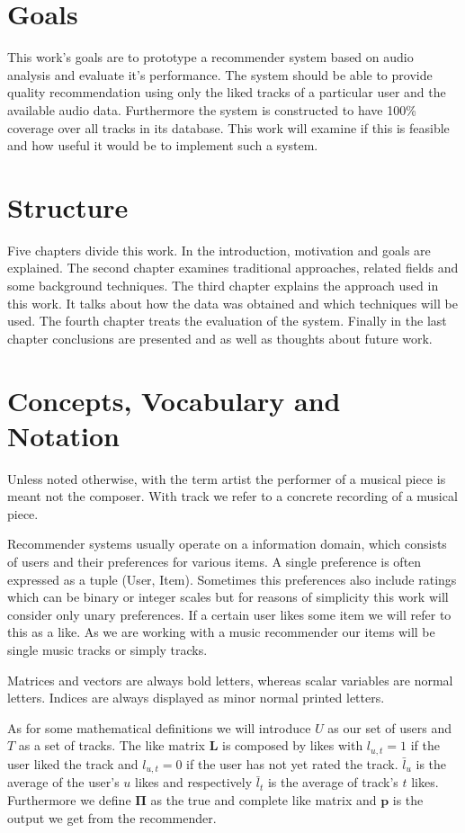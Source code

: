 \documentclass[cic,tc,english]{iiufrgs}
\begin{document}
\section{Goals}
This work's goals are to prototype a recommender system based on audio analysis and evaluate it's performance. The system should be able to provide quality recommendation using only the liked tracks of a particular user and the available audio data. Furthermore the system is constructed to have 100\% coverage over all tracks in its database. This work will examine if this is feasible and how useful it would be to implement such a system. 

\section{Structure}
Five chapters divide this work. In the introduction, motivation and goals are explained. The second chapter examines traditional approaches, related fields and some background techniques. The third chapter explains the approach used in this work. It talks about how the data was obtained and which techniques will be used. The fourth chapter treats the evaluation of the system. Finally in the last chapter conclusions are presented and as well as thoughts about future work.

\section{Concepts, Vocabulary and Notation}
Unless noted otherwise, with the term artist the performer of a musical piece is meant not the composer. With track we refer to a concrete recording of a musical piece.  


Recommender systems usually operate on a information domain, which consists of users and their preferences for various items. A single preference is often expressed as a tuple (User, Item). Sometimes this preferences also include ratings which can be binary or integer scales but for reasons of simplicity this work will consider only unary preferences. If a certain user likes some item we will refer to this as a like. As we are working with a music recommender our items will be single music tracks or simply tracks.

Matrices and vectors are always bold letters, whereas scalar variables are normal letters. Indices are always displayed as minor normal printed letters.


As for some mathematical definitions we will introduce $U$ as our set of users and $T$ as a set of tracks. The like matrix $\mathbf{L}$ is composed by likes with $l_{u,t} = 1$ if the user liked the track and $l_{u,t} = 0$ if the user has not yet rated the track. $\bar{l}_{u}$ is the average of the user's $u$ likes and respectively $\bar{l}_{t}$ is the average of track's $t$ likes. Furthermore we define $\mathbf{\Pi}$ as the true and complete like matrix and $\mathbf{p}$ is the output we get from the recommender.
\end{document}
